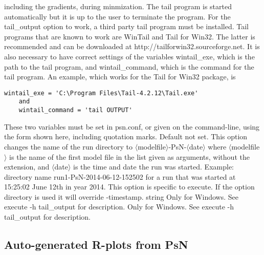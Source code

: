\begin{optionlist}
including the gradients, during minmization. The tail program is started automatically but it is up to the user to terminate the program.
For the tail_output option to work, a third party tail program must be installed. Tail programs that are known to work are WinTail and Tail for Win32.  
The latter is recommended and can be downloaded at http://tailforwin32.sourceforge.net. It is also necessary to have correct settings of the variables 
wintail\_exe, which is the path to the tail program, and wintail\_command, which is the command for the tail program. An example, which works for 
the Tail for Win32 package, is

\begin{verbatim}    
wintail_exe = 'C:\Program Files\Tail-4.2.12\Tail.exe'
    and
    wintail_command = 'tail OUTPUT'
\end{verbatim}
These two variables must be set in psn.conf, or given on the command-line, using the form shown here, including quotation marks.
\nextopt
{}
Default not set. This option changes the name of the run directory to $\langle$modelfile$\rangle$-PsN-$\langle$date$\rangle$
where $\langle$modelfile$\rangle$ is the name of the first model file in the list given as arguments, without the extension,
and $\langle$date$\rangle$ is the time and date the run was started. 
Example: directory name run1-PsN-2014-06-12-152502 for a run that was started at 15:25:02 June 12th in year 2014.
This option is specific to execute.
If the option directory is used it will override -timestamp.
\nextopt
{} {string}
Only for Windows. See execute -h tail\_output for description.
\nextopt
{}
Only for Windows. See execute -h tail\_output for description.
 \nextopt
\end{optionlist}

\subsection{Auto-generated R-plots from PsN}
\newcommand{\rplotsconditions}{The default execute template 
requires the xpose4 R library. It also relies on Xpose-type tables being 
created, such as sdtab, patab and cotab, with the correct run number. 
See the Xpose documentation for requirements on such table files,
e.g. pages 106-108 in\\
\texttt{http://xpose.sourceforge.net/bestiarium\_v1.0.pdf}.\\
If option -subset\_variable\_rplots is used, 
the user must ensure that the subset variable
is printed to one of the xpose tables, for example sdtab, and then
there will be separate plots created for
subsets of the data, via xpose options 'subset' and 'by'. 
Xpose will treat the subset variable as continuous or categorical
based the number of unique values. The template contains 
a comment line with the xpose command for changing the default classification. 

If the conditions for creating the plots are not fulfilled then no pdf will be generated,
see the .Rout file in the main run directory for error messages.}


